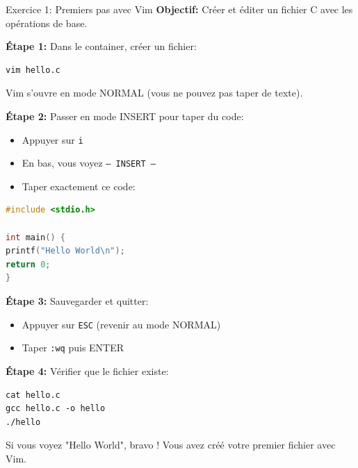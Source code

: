 \documentclass[10pt,a4paper]{article}
\begin{document}
\begin{exercicebox}{Exercice 1: Premiers pas avec Vim}
\textbf{Objectif:} Créer et éditer un fichier C avec les opérations de base.

\textbf{Étape 1:} Dans le container, créer un fichier:
\begin{verbatim}
vim hello.c
\end{verbatim}

Vim s'ouvre en mode NORMAL (vous ne pouvez pas taper de texte).

\textbf{Étape 2:} Passer en mode INSERT pour taper du code:
\begin{itemize}
\item Appuyer sur \texttt{i}
\item En bas, vous voyez \texttt{-- INSERT --}
\item Taper exactement ce code:
\end{itemize}

\begin{lstlisting}[language=C]
#include <stdio.h>

int main() {
printf("Hello World\n");
return 0;
}
\end{lstlisting}

\textbf{Étape 3:} Sauvegarder et quitter:
\begin{itemize}
\item Appuyer sur \texttt{ESC} (revenir au mode NORMAL)
\item Taper \texttt{:wq} puis ENTER
\end{itemize}

\textbf{Étape 4:} Vérifier que le fichier existe:
\begin{verbatim}
cat hello.c
gcc hello.c -o hello
./hello
\end{verbatim}

Si vous voyez "Hello World", bravo ! Vous avez créé votre premier fichier avec Vim.
\end{exercicebox}
\end{document}
